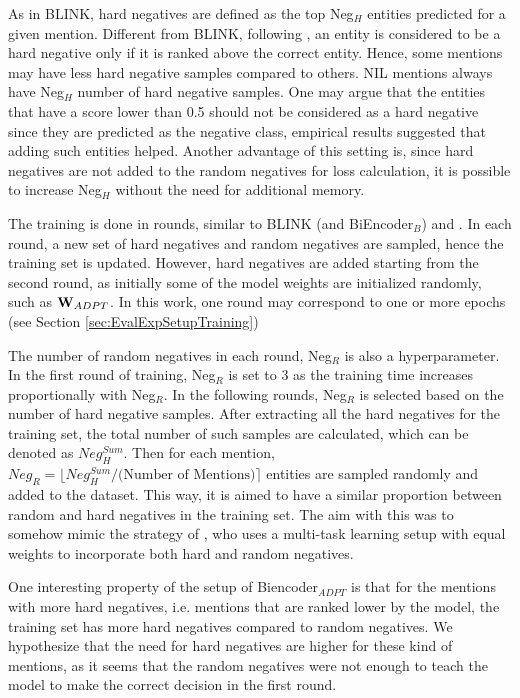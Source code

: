 \documentclass{report}
\theoremstyle{definition}
\theoremstyle{remark}
\begin{document}
As in BLINK, hard negatives are defined as the top Neg$_{H}$ entities predicted for a given mention. Different from BLINK, following \cite{googleintern}, an entity is considered to be a hard negative only if it is ranked above the correct entity. Hence, some mentions may have less hard negative samples compared to others. NIL mentions always have Neg$_{H}$ number of hard negative samples. One may argue that the entities that have a score lower than 0.5 should not be considered as a hard negative since they are predicted as the negative class, empirical results suggested that adding such entities helped. Another advantage of this setting is, since hard negatives are not added to the random negatives for loss calculation, it is possible to increase Neg$_{H}$ without the need for additional memory.

The training is done in rounds, similar to BLINK (and BiEncoder$_{B}$) and \cite{googleintern}. In each round, a new set of hard negatives and random negatives are sampled, hence the training set is updated. However, hard negatives are added starting from the second round, as initially some of the model weights are initialized randomly, such as $\bold{W}_{ADPT}$. In this work, one round may correspond to one or more epochs (see Section \ref{sec:EvalExpSetupTraining})

The number of random negatives in each round, Neg$_R$ is also a hyperparameter. In the first round of training, Neg$_R$ is set to 3 as the training time increases proportionally with Neg$_R$. In the following rounds, Neg$_R$ is selected based on the number of hard negative samples. After extracting all the hard negatives for the training set, the total number of such samples are calculated, which can be denoted as $Neg_{H}^{Sum}$. Then for each mention, $Neg_R = \lfloor Neg_{H}^{Sum}/ \text{(Number of Mentions)} \rceil$ entities are sampled randomly and added to the dataset. This way, it is aimed to have a similar proportion between random and hard negatives in the training set. The aim with this was to somehow mimic the strategy of \cite{googleintern}, who uses a multi-task learning setup with equal weights to incorporate both hard and random negatives. 

One interesting property of the setup of Biencoder$_{ADPT}$ is that for the mentions with more hard negatives, i.e. mentions that are ranked lower by the model, the training set has more hard negatives compared to random negatives. We hypothesize that the need for hard negatives are higher for these kind of mentions, as it seems that the random negatives were not enough to teach the model to make the correct decision in the first round.
\end{document}
